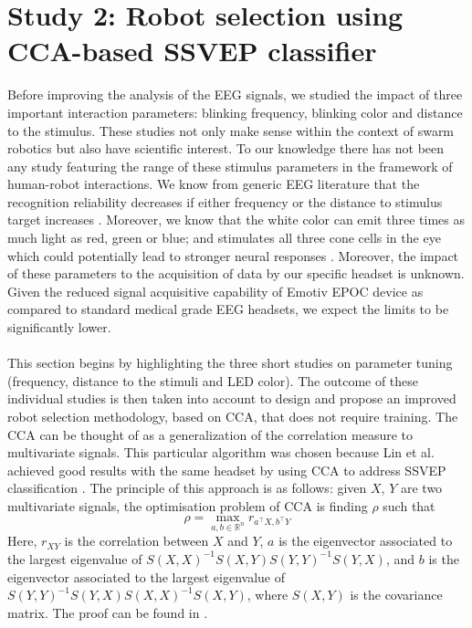 \documentclass{svmult}
\begin{document}
\section{Study 2: Robot selection using CCA-based SSVEP classifier}
\label{sec:CCA_approach}
Before improving the analysis of the EEG signals, we studied the impact of three important interaction parameters: blinking frequency, blinking color and distance to the stimulus. These studies not only make sense within the context of swarm robotics but also have scientific interest. To our knowledge there has not been any study featuring the range of these stimulus parameters in the framework of human-robot interactions. We know from generic EEG literature that the recognition reliability decreases if either frequency or the distance to stimulus target increases \cite{herrmann2001, wu2013effect}. Moreover, we know that the white color can emit three times as much light as red, green or blue; and stimulates all three cone cells in the eye which could potentially lead to stronger neural responses \cite{aljshamee2016discriminate, cao2012flashing}. Moreover, the impact of these parameters to the acquisition of data by our specific headset is unknown. Given the reduced signal acquisitive capability of Emotiv EPOC device as compared to standard medical grade EEG headsets, we expect the limits to be significantly lower.\\
\\
This section begins by highlighting the three short studies on parameter tuning (frequency, distance to the stimuli and LED color). 
The outcome of these individual studies is then taken into account to design and propose an improved robot selection methodology, based on CCA, that does not require training. 
The CCA can be thought of as a generalization of the correlation measure to multivariate signals. 
This particular algorithm was chosen because Lin et al. achieved good results with the same headset by using CCA to address SSVEP classification \cite{Lin2014}. The principle of this approach is as follows: given $X$, $Y$ are two multivariate signals, the optimisation problem of CCA is finding $\rho$ such that
\\
\begin{equation}
\label{rho}
\rho = \max_{a, b \in \mathbb R^n}  r_{ a^\top X, b^\top Y}
\end{equation}
Here,  $r_{XY}$ is the correlation between $X$ and $Y$,  $a$ is the eigenvector associated to the largest eigenvalue of $S(X, X)^{-1} S(X,Y) S(Y, Y)^{-1} S(Y, X)$, and $b$ is the eigenvector associated to the largest eigenvalue of $S(Y, Y)^{-1} S(Y, X) S(X, X)^{-1} S(X, Y)$, where $S(X, Y)$ is the covariance matrix. The proof  can be found in \cite{rencher2003}.
\end{document}
